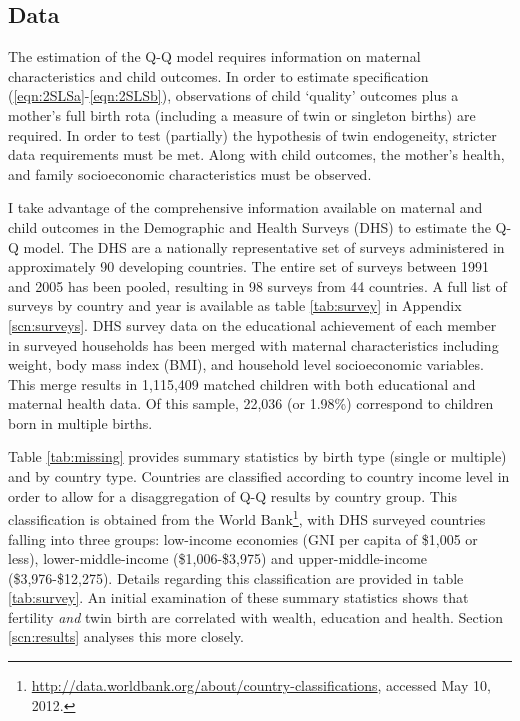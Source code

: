 \documentclass{article}[11pt,subeqn]
\begin{document}
\begin{spacing}{1.5}
\section{Data}
\label{scn:data}
\vspace{-5mm}
The estimation of the Q-Q model requires information on maternal characteristics and child outcomes. In order to estimate 
specification (\ref{eqn:2SLSa}-\ref{eqn:2SLSb}), observations of child `quality' outcomes plus a mother's full birth rota (including a 
measure of twin or singleton births) are required.  In order to test (partially) the hypothesis of twin endogeneity, stricter data requirements 
must be met.  Along with child outcomes, the mother's health, and family socioeconomic characteristics must be observed.

I take advantage of the comprehensive information available on maternal and child outcomes in the Demographic and Health Surveys (DHS) 
to estimate the Q-Q model.  The DHS are a nationally representative set of surveys administered in approximately 90 developing countries.  
The entire set of surveys between 1991 and 2005 has been pooled, resulting in 98 surveys from 44 countries.  A full list of surveys by 
country and year is available as table \ref{tab:survey} in Appendix \ref{scn:surveys}.  DHS survey data on the educational achievement 
of each member in surveyed households has been merged with maternal characteristics including weight, body mass index (BMI), and 
household level socioeconomic variables.  This merge results in 1,115,409 matched children with both educational and maternal health
data.  Of this sample, 22,036 (or 1.98\%) correspond to children born in multiple births.

Table \ref{tab:missing} provides summary statistics by birth type (single or multiple) and by country type.  Countries are classified 
according to country income level in order to allow for a disaggregation of Q-Q results by country group.  This classification is obtained
from the World Bank\footnote{\url{http://data.worldbank.org/about/country-classifications},  accessed May 10, 2012.}, with DHS
surveyed countries falling into three groups: low-income economies (GNI per capita of \$1,005 or less), lower-middle-income (\$1,006-\$3,975)
and upper-middle-income (\$3,976-\$12,275).  Details regarding this classification are provided in table \ref{tab:survey}.  An initial 
examination of these summary statistics shows that fertility \emph{and} twin birth are correlated with wealth, education and health.
Section \ref{scn:results} analyses this more closely.


\end{spacing}
\end{document}
